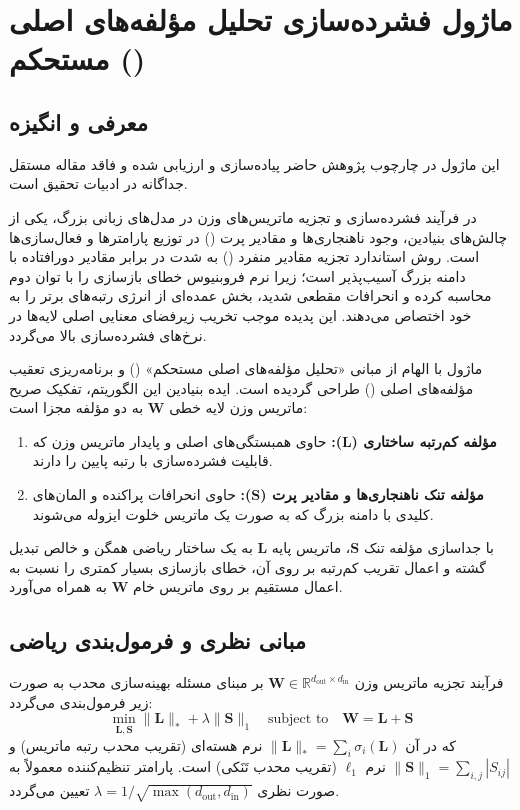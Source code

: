 \section{ماژول فشرده‌سازی تحلیل مؤلفه‌های اصلی مستحکم ()}
\label{sec:rpca_compressor}

\subsection{معرفی و انگیزه}
این ماژول در چارچوب پژوهش حاضر پیاده‌سازی و ارزیابی شده و فاقد مقاله مستقل جداگانه در ادبیات تحقیق است.

در فرآیند فشرده‌سازی و تجزیه ماتریس‌های وزن در مدل‌های زبانی بزرگ، یکی از چالش‌های بنیادین، وجود ناهنجاری‌ها و مقادیر پرت () در توزیع پارامترها و فعال‌سازی‌ها است. روش استاندارد تجزیه مقادیر منفرد () به شدت در برابر مقادیر دورافتاده با دامنه بزرگ آسیب‌پذیر است؛ زیرا نرم فروبنیوس خطای بازسازی را با توان دوم محاسبه کرده و انحرافات مقطعی شدید، بخش عمده‌ای از انرژی رتبه‌های برتر  را به خود اختصاص می‌دهند. این پدیده موجب تخریب زیرفضای معنایی اصلی لایه‌ها در نرخ‌های فشرده‌سازی بالا می‌گردد.

ماژول  با الهام از مبانی «تحلیل مؤلفه‌های اصلی مستحکم» () و برنامه‌ریزی تعقیب مؤلفه‌های اصلی () طراحی گردیده است. ایده بنیادین این الگوریتم، تفکیک صریح ماتریس وزن لایه خطی $\mathbf{W}$ به دو مؤلفه مجزا است:
\begin{enumerate}
    \item \textbf{مؤلفه کم‌رتبه ساختاری ($\mathbf{L}$):} حاوی همبستگی‌های اصلی و پایدار ماتریس وزن که قابلیت فشرده‌سازی با رتبه پایین را دارند.
    \item \textbf{مؤلفه تنک ناهنجاری‌ها و مقادیر پرت ($\mathbf{S}$):} حاوی انحرافات پراکنده و المان‌های کلیدی با دامنه بزرگ که به صورت یک ماتریس خلوت ایزوله می‌شوند.
\end{enumerate}
با جداسازی مؤلفه تنک $\mathbf{S}$، ماتریس پایه $\mathbf{L}$ به یک ساختار ریاضی همگن و خالص تبدیل گشته و اعمال تقریب کم‌رتبه بر روی آن، خطای بازسازی بسیار کمتری را نسبت به اعمال مستقیم  بر روی ماتریس خام $\mathbf{W}$ به همراه می‌آورد.

\subsection{مبانی نظری و فرمول‌بندی ریاضی}
فرآیند تجزیه ماتریس وزن $\mathbf{W} \in \mathbb{R}^{d_{\text{out}} \times d_{\text{in}}}$ بر مبنای مسئله بهینه‌سازی محدب  به صورت زیر فرمول‌بندی می‌گردد:
\begin{equation}
\min_{\mathbf{L}, \mathbf{S}} \|\mathbf{L}\|_* + \lambda \|\mathbf{S}\|_1 \quad \text{subject to} \quad \mathbf{W} = \mathbf{L} + \mathbf{S}
\end{equation}
که در آن $\|\mathbf{L}\|_* = \sum_i \sigma_i(\mathbf{L})$ نرم هسته‌ای (تقریب محدب رتبه ماتریس) و $\|\mathbf{S}\|_1 = \sum_{i,j} |S_{ij}|$ نرم $\ell_1$ (تقریب محدب تَنَکی) است. پارامتر تنظیم‌کننده معمولاً به صورت نظری $\lambda = 1 / \sqrt{\max(d_{\text{out}}, d_{\text{in}})}$ تعیین می‌گردد.

